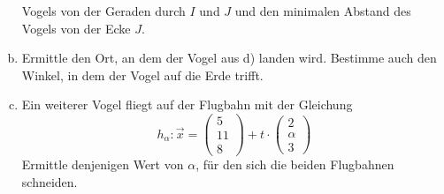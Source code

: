 \begin{exercise}
\begin{enumerate}[a)]
            Vogels von der Geraden durch $I$ und $J$ und den minimalen
            Abstand des Vogels von der Ecke $J$.
      \item Ermittle den Ort, an dem der Vogel aus d) landen wird.
            Bestimme auch den Winkel, in dem der Vogel auf die Erde trifft.
      \item Ein weiterer Vogel fliegt auf der Flugbahn mit der Gleichung
            \begin{equation*}
              h_{\alpha}:\vec{x}=
              \begin{pmatrix} 5 \\ 11 \\ 8 \end{pmatrix}
              +t\cdot
              \begin{pmatrix} 2 \\ \alpha \\ 3 \end{pmatrix}
            \end{equation*}
            Ermittle denjenigen Wert von $\alpha$, für den sich die beiden
            Flugbahnen schneiden.
    \end{enumerate}
  \fi
\end{exercise}
